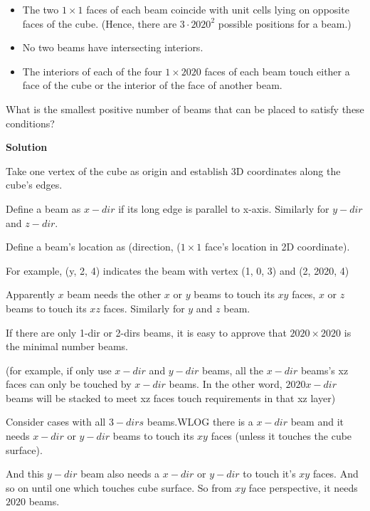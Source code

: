 \begin{enumerate}
 
            \begin{itemize}
        \item The two $1 \times 1$ faces of each beam coincide with unit cells lying on opposite faces of the cube. (Hence, there are $3 \cdot 2020^2$ possible positions for a beam.)

        \item No two beams have intersecting interiors.

        \item The interiors of each of the four $1 \times 2020$ faces of each beam touch either a face of the cube or the interior of the face of another beam.
            \end{itemize}
            What is the smallest positive number of beams that can be placed to satisfy these conditions?


 



\textbf{Solution}

Take one vertex of the cube as origin and establish 3D coordinates along the cube's edges.

 Define a beam as $x-dir$ if its long edge is parallel to x-axis. Similarly for $y-dir$ and $z-dir$.

 Define a beam's location as (direction, ($1 \times 1$ face's location in 2D coordinate).

 For example, (y, 2, 4) indicates the beam with vertex (1, 0, 3) and (2, 2020, 4)

 Apparently $x$ beam needs the other $x$ or $y$ beams to touch its $xy$ faces, $x$ or $z$ beams to touch its $xz$ faces. Similarly for $y$ and $z$ beam.

 If there are only 1-dir or 2-dirs beams, it is easy to approve that $2020 \times 2020$ is the minimal number beams.

 (for example, if only use $x-dir$ and $y-dir$ beams, all the $x-dir$ beams's xz faces can only be touched by $x-dir$ beams. In the other word, $2020 x-dir$ beams will be stacked to meet xz faces touch requirements in that xz layer)

 Consider cases with all $3-dirs$ beams.WLOG there is a $x-dir$ beam and it needs $x-dir$ or $y-dir$ beams to touch its $xy$ faces (unless it touches the cube surface). 

 And this $y-dir$ beam also needs a $x-dir$ or $y-dir$ to touch it's $xy$ faces. And so on until one which touches cube surface. So from $xy$ face perspective, it needs $2020$ beams.


\end{enumerate}
